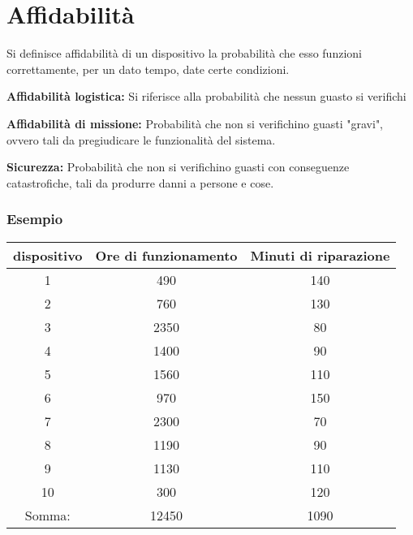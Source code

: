 \section{Affidabilità}
Si definisce affidabilità di un dispositivo la probabilità che esso funzioni correttamente, per un dato tempo, date certe condizioni.

\spacer
\begin{sitemize}
    \item \textbf{Affidabilità logistica:} Si riferisce alla probabilità che nessun guasto si verifichi
    \item \textbf{Affidabilità di missione:} Probabilità che non si verifichino guasti "gravi", ovvero tali da pregiudicare le funzionalità del sistema.
    \item \textbf{Sicurezza:} Probabilità che non si verifichino guasti con conseguenze catastrofiche, tali da produrre danni a persone e cose.
\end{sitemize}

\subsubsection*{Esempio}
\begin{center}
    \begin{tabular}{ | c | c | c | }
        \hline
        dispositivo & Ore di funzionamento & Minuti di riparazione \\
        \hline \hline
        1           & 490                  & 140                   \\
        2           & 760                  & 130                   \\
        3           & 2350                 & 80                    \\
        4           & 1400                 & 90                    \\
        5           & 1560                 & 110                   \\
        6           & 970                  & 150                   \\
        7           & 2300                 & 70                    \\
        8           & 1190                 & 90                    \\
        9           & 1130                 & 110                   \\
        10          & 300                  & 120                   \\
        \hline
        Somma:      & 12450                & 1090                  \\
        \hline
    \end{tabular}
\end{center}

